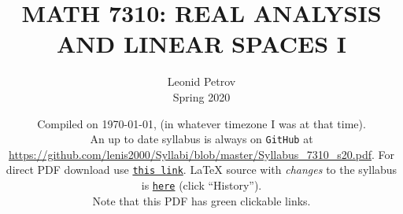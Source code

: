 \documentclass[oneside,11pt]{amsart}
\begin{document}
\title[MATH 7310: REAL ANALYSIS AND LINEAR SPACES I]{MATH 7310: REAL ANALYSIS AND LINEAR SPACES I}
\author{Leonid Petrov\\Spring 2020}
\date{Compiled on \today, \currenttime{} (in whatever timezone I was at that time).\\An up to date syllabus is always on \texttt{GitHub} at \url{https://github.com/lenis2000/Syllabi/blob/master/Syllabus_7310_s20.pdf}. For direct PDF download use \href{https://github.com/lenis2000/Syllabi/raw/master/Syllabus_7310_s20.pdf}{\texttt{this link}}.
	\LaTeX{} source with \textit{changes} to the syllabus is \href{https://github.com/lenis2000/Syllabi/blob/master/Syllabus_7310_s20.tex}{\texttt{here}}
(click ``History'').
\\Note that this PDF has green clickable links.}
\maketitle
\end{document}
